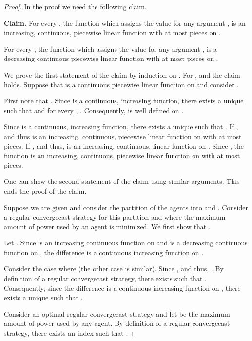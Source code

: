 \documentclass{article}
\newcommand\convergecast{convergecast\xspace}
\begin{document}
\begin{proof}
In the proof we need the following claim. 

\medskip

\noindent\textbf{Claim. }
For every , the function  which assigns the value  for any argument , is an increasing, continuous, piecewise linear function with at most  pieces on .

For every , the function  which assigns the value  for any argument , is a decreasing continuous piecewise linear function with at most  pieces on .

\medskip

We prove the first statement of the claim by induction on . For
,  and the claim holds. Suppose that
 is a continuous piecewise linear function on
 and consider .

First note that . Since
 is a continuous, increasing function, there
exists a unique  such that  and for every , . Consequently,  is well defined
on . 

Since  is a continuous, increasing function, there
exists a unique  such that . If ,
 and thus
 is an increasing, continuous, piecewise linear
function on  with at most  pieces. If ,
 and thus,  is an
increasing, continuous, linear function on . Since , the function  is an
  increasing, continuous, piecewise linear function on  with at most  pieces. 

One can show the second statement of the claim using similar
arguments. This ends the proof of the claim.



Suppose we are given  and consider the partition of the agents into
 and . Consider a regular
{\convergecast} strategy for this partition and where the maximum
amount of power  used by an agent is minimized. We first show that
.

Let .  Since
 is an increasing continuous function on
 and  is a decreasing
continuous function on , the difference
 is a continuous
increasing function on .

Consider the case where  (the
other case is similar). Since ,  and thus, .  By definition of a regular convergecast strategy, there exists  such that
. Consequently, since the difference  is a continuous
increasing function on , there
exists a unique  such that .

Consider an optimal regular {\convergecast} strategy and let  be the
maximum amount of power used by any agent. By definition of a regular convergecast strategy,
there
exists an index  such that . 


\end{proof}
\end{document}

